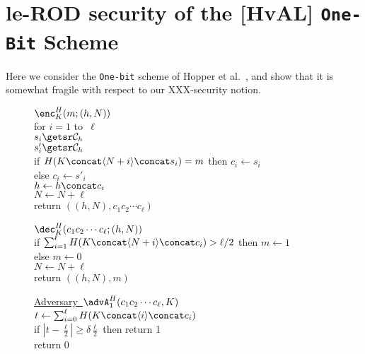 \section{le-ROD security of the [HvAL] \texttt{One-Bit} Scheme}

Here we consider the \texttt{One-bit} scheme of Hopper et al.\
\cite{HvAL}, and show that it is somewhat fragile with respect to
our XXX-security notion.

\begin{figure}[tph]
\begin{center}
{
\underline{$\enc^H_K(m;(h,N))$}\\[2pt]
for $i=1$ to~$\ell$\\
\nudge $s_i \getsr \mathcal{C}_h$\\
\nudge $s'_i \getsr \mathcal{C}_h$\\
\nudge if $H(K \concat \langle N+i \rangle \concat s_i)=m$ then $c_i \gets s_i$\\
\nudge else $c_i \gets s'_i$\\
\nudge $h \gets h \concat c_i$\\
$N \gets N + \ell$\\
return $((h,N), c_1 c_2 \cdots c_\ell)$

\medskip
\underline{$\dec^H_K(c_1 c_2 \cdots c_\ell;(h,N))$}\\[2pt]
if $\sum_{i=1}^{\ell} H(K \concat \langle N+i \rangle \concat
c_i) > \ell/2$ then $m \gets 1$\\
else $m \gets 0$\\
$N \gets N+\ell$\\
return $((h,N),m)$
}
{
\underline{Adversary~$\advA_1^H(c_1 c_2 \cdots c_\ell, K)$}\\[2pt]
$t \gets \sum_{i=0}^{\ell} H(K \concat \langle i \rangle \concat c_i)$\\
if $\left| t - \frac{\ell}{2} \right| \geq \delta\frac{\ell}{2}$ 
 then return 1\\
return 0

}
\end{center}
\end{figure}
